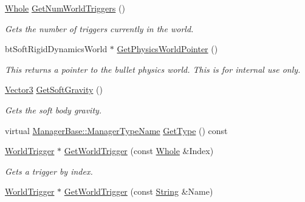 \begin{DoxyCompactItemize}
\hyperlink{namespaceMezzanine_adcbb6ce6d1eb4379d109e51171e2e493}{Whole} \hyperlink{classMezzanine_1_1PhysicsManager_a43aa5298c72eba68b017838e902bc19b}{GetNumWorldTriggers} ()
\begin{DoxyCompactList}\small\item\em Gets the number of triggers currently in the world. \item\end{DoxyCompactList}\item 
\hypertarget{classMezzanine_1_1PhysicsManager_ae8ba569b66769515c8efa8eba2131c14}{
btSoftRigidDynamicsWorld $\ast$ \hyperlink{classMezzanine_1_1PhysicsManager_ae8ba569b66769515c8efa8eba2131c14}{GetPhysicsWorldPointer} ()}
\label{classMezzanine_1_1PhysicsManager_ae8ba569b66769515c8efa8eba2131c14}

\begin{DoxyCompactList}\small\item\em This returns a pointer to the bullet physics world. This is for internal use only. \item\end{DoxyCompactList}\item 
\hyperlink{classMezzanine_1_1Vector3}{Vector3} \hyperlink{classMezzanine_1_1PhysicsManager_aa1fdbb815c43718c1c0e68b29a3e9915}{GetSoftGravity} ()
\begin{DoxyCompactList}\small\item\em Gets the soft body gravity. \item\end{DoxyCompactList}\item 
virtual \hyperlink{classMezzanine_1_1ManagerBase_a08cecf5169cad3e82be81a3a159b0b6e}{ManagerBase::ManagerTypeName} \hyperlink{classMezzanine_1_1PhysicsManager_a87b1640bc429ee1850c408bd8a13cdce}{GetType} () const 
\item 
\hyperlink{classMezzanine_1_1WorldTrigger}{WorldTrigger} $\ast$ \hyperlink{classMezzanine_1_1PhysicsManager_a9995e10453b675587423134c82d5cbe0}{GetWorldTrigger} (const \hyperlink{namespaceMezzanine_adcbb6ce6d1eb4379d109e51171e2e493}{Whole} \&Index)
\begin{DoxyCompactList}\small\item\em Gets a trigger by index. \item\end{DoxyCompactList}\item 
\hyperlink{classMezzanine_1_1WorldTrigger}{WorldTrigger} $\ast$ \hyperlink{classMezzanine_1_1PhysicsManager_adecd547ebb51380ae23fcbb889ed544c}{GetWorldTrigger} (const \hyperlink{namespaceMezzanine_acf9fcc130e6ebf08e3d8491aebcf1c86}{String} \&Name)

\end{DoxyCompactItemize}
